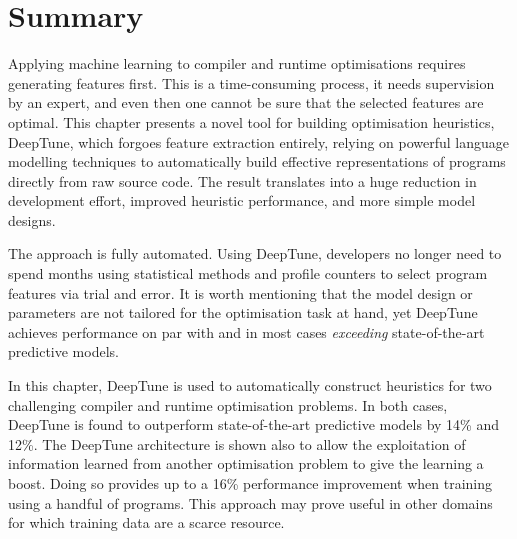 \section{Summary}
\label{sec:deeptune-conclusion}

Applying machine learning to compiler and runtime optimisations requires generating features first. This is a time-consuming process, it needs supervision by an expert, and even then one cannot be sure that the selected features are optimal. This chapter presents a novel tool for building optimisation heuristics, DeepTune, which forgoes feature extraction entirely, relying on powerful language modelling techniques to automatically build effective representations of programs directly from raw source code. The result translates into a huge reduction in development effort, improved heuristic performance, and more simple model designs.

The approach is fully automated. Using DeepTune, developers no longer need to spend months using statistical methods and profile counters to select program features via trial and error. It is worth mentioning that the model design or parameters are not tailored for the optimisation task at hand, yet DeepTune achieves performance on par with and in most cases \emph{exceeding} state-of-the-art predictive models.

In this chapter, DeepTune is used to automatically construct heuristics for two challenging compiler and runtime optimisation problems. In both cases, DeepTune is found to outperform state-of-the-art predictive models by 14\% and 12\%. The DeepTune architecture is shown also to allow the exploitation of information learned from another optimisation problem to give the learning a boost. Doing so provides up to a 16\% performance improvement when training using a handful of programs. This approach may prove useful in other domains for which training data are a scarce resource.
